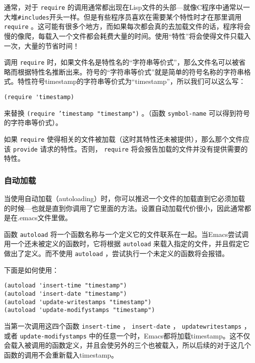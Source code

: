 通常，对于 \texttt{require} 的调用通常都出现在Lisp文件的头部---就像C程序中通常以一大堆\texttt{#includes}开头一样。但是有些程序员喜欢在需要某个特性时才在那里调用 \texttt{require} 。这可能有很多个地方，而如果每次都会真的去加载文件的话，程序将会慢的像爬，每载入一个文件都会耗费大量的时间。使用“特性”将会使得文件只载入一次，大量的节省时间！

调用 \texttt{require} 时，如果文件名是特性名的“字符串等价式”，那么文件名可以被省略而根据特性名推断出来。符号的“字符串等价式”就是简单的符号名称的字符串格式。特性符号timestamp的字符串等价式为“timestamp”，所以我们可以这么写：

\begin{verbatim}
(require 'timestamp)
\end{verbatim}

来替换 \texttt{(require 'timestamp "timestamp")} 。（函数 \texttt{symbol-name} 可以得到符号的字符串等价式）。

如果 \texttt{require} 使得相关的文件被加载（这时其特性还未被提供），那么那个文件应该 \texttt{provide} 请求的特性。否则， \texttt{require} 将会报告加载的文件并没有提供需要的特性。

\subsubsection{自动加载}
\label{section:05-Autoloading}

当使用自动加载（autoloading）时，你可以推迟一个文件的加载直到它必须加载的时候---也就是直到你调用了它里面的方法。设置自动加载代价很小，因此通常都是在.emacs文件里做。

函数 \texttt{autoload} 将一个函数名称与一个定义它的文件联系在一起。当Emacs尝试调用一个还未被定义的函数时，它将根据 \texttt{autoload} 来载入指定的文件，并且假定它做出了定义。而不使用 \texttt{autoload} ，尝试执行一个未定义的函数将会报错。

下面是如何使用：

\begin{verbatim}
(autoload 'insert-time "timestamp")
(autoload 'insert-date "timestamp")
(autoload 'update-writestamps "timestamp")
(autoload 'update-modifystamps "timestamp")
\end{verbatim}

当第一次调用这四个函数 \texttt{insert-time} ， \texttt{insert-date} ， \texttt{updatewritestamps} ，或者 \texttt{update-modifystamps} 中的任意一个时，Emacs都将加载timestamp。这不仅会载入被调用的函数定义，并且会使另外的三个也被载入，所以后续的对于这几个函数的调用不会重新载入timestamp。

